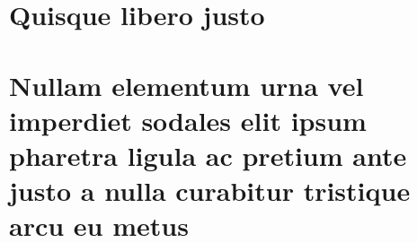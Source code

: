 \documentclass[
	12pt,				%
	oneside,            %
	a4paper,			%
	english,			%
	french,				%
	spanish,			%
	brazil,				%
	]{abntex2}
\begin{document}


%
%


\begin{apendicesenv}

\partapendices

\chapter{Quisque libero justo}

\lipsum[50]

\chapter{Nullam elementum urna vel imperdiet sodales elit ipsum pharetra ligula
ac pretium ante justo a nulla curabitur tristique arcu eu metus}
\lipsum[55-57]

\end{apendicesenv}


\end{document}
